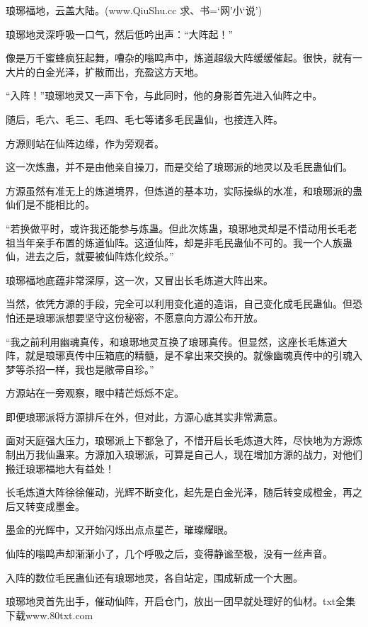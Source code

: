 
\begin{this_body}

琅琊福地，云盖大陆。(www.QiuShu.cc 求、书=‘网’小‘说’)

琅琊地灵深呼吸一口气，然后低吟出声：“大阵起！”

像是万千蜜蜂疯狂起舞，嘈杂的嗡鸣声中，炼道超级大阵缓缓催起。很快，就有一大片的白金光泽，扩散而出，充盈这方天地。

“入阵！”琅琊地灵又一声下令，与此同时，他的身影首先进入仙阵之中。

随后，毛六、毛三、毛四、毛七等诸多毛民蛊仙，也接连入阵。

方源则站在仙阵边缘，作为旁观者。

这一次炼蛊，并不是由他亲自操刀，而是交给了琅琊派的地灵以及毛民蛊仙们。

方源虽然有准无上的炼道境界，但炼道的基本功，实际操纵的水准，和琅琊派的蛊仙们是不能相比的。

“若换做平时，或许我还能参与炼蛊。但此次炼蛊，琅琊地灵却是不惜动用长毛老祖当年亲手布置的炼道仙阵。这道仙阵，却是非毛民蛊仙不可的。我一个人族蛊仙，进去之后，就要被仙阵炼化绞杀。”

琅琊福地底蕴非常深厚，这一次，又冒出长毛炼道大阵出来。

当然，依凭方源的手段，完全可以利用变化道的造诣，自己变化成毛民蛊仙。但恐怕还是琅琊派想要坚守这份秘密，不愿意向方源公布开放。

“我之前利用幽魂真传，和琅琊地灵互换了琅琊真传。但显然，这座长毛炼道大阵，就是琅琊真传中压箱底的精髓，是不拿出来交换的。就像幽魂真传中的引魂入梦等杀招一样，我也是敝帚自珍。”

方源站在一旁观察，眼中精芒烁烁不定。

即便琅琊派将方源排斥在外，但对此，方源心底其实非常满意。

面对天庭强大压力，琅琊派上下都急了，不惜开启长毛炼道大阵，尽快地为方源炼制出万我仙蛊来。方源加入琅琊派，可算是自己人，现在增加方源的战力，对他们搬迁琅琊福地大有益处！

长毛炼道大阵徐徐催动，光辉不断变化，起先是白金光泽，随后转变成橙金，再之后又转变成墨金。

墨金的光辉中，又开始闪烁出点点星芒，璀璨耀眼。

仙阵的嗡鸣声却渐渐小了，几个呼吸之后，变得静谧至极，没有一丝声音。

入阵的数位毛民蛊仙还有琅琊地灵，各自站定，围成斩成一个大圈。

琅琊地灵首先出手，催动仙阵，开启仓门，放出一团早就处理好的仙材。txt全集下载www.80txt.com


\end{this_body}
